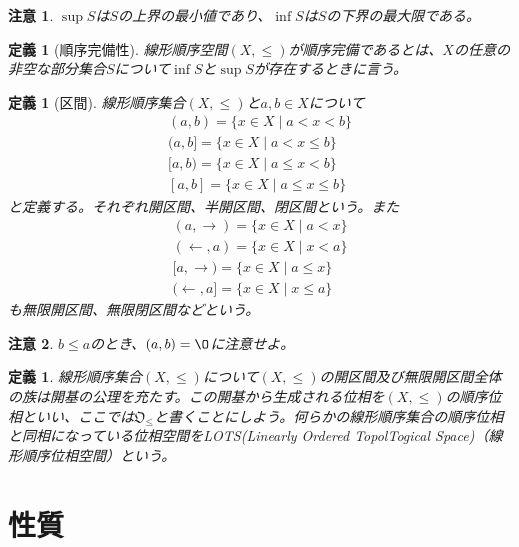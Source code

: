 \documentclass[leqno]{jsarticle}
\newtheorem{df}[thm]{定義}
\newtheorem*{cau}{注意}
\begin{document}
\begin{cau}
$\sup S$は$S$の上界の最小値であり、$\inf S$は$S$の下界の最大限である。
\end{cau}

\begin{df}[順序完備性]
線形順序空間$(X,\le)$が順序完備であるとは、$X$の任意の非空な部分集合$S$について$\inf S$と$\sup S$が存在するときに言う。
\end{df}

\begin{df}[区間]
線形順序集合$(X,\le)$と$a,b\in X$について
\begin{align}
(a,b)=\{x\in X\mid a<x<b\}\\
(a,b]=\{x\in X\mid a<x\le b\}\\
[a,b)=\{x\in X\mid a\le x<b\}\\
[a,b]=\{x\in X\mid a\le x\le b\}
\end{align}
と定義する。それぞれ開区間、半開区間、閉区間という。また
\begin{align}
(a,\to)=\{x\in X\mid a<x \}\\
(\gets,a)=\{x\in X\mid x<a\}\\
[a,\to)=\{x\in X\mid a\le x\}\\
(\gets,a]=\{x\in X\mid x\le a \}
\end{align}
も無限開区間、無限閉区間などという。
\end{df}

\begin{cau}
$b\le a$のとき、$(a,b)=\O$に注意せよ。
\end{cau}

\begin{df}
線形順序集合$(X,\le)$について$(X,\le )$の開区間及び無限開区間全体の族は開基の公理を充たす。この開基から生成される位相を$(X,\le)$の順序位相といい、ここでは$\mathfrak{O}_{\le}$と書くことにしよう。何らかの線形順序集合の順序位相と同相になっている位相空間をLOTS(Linearly Ordered TopolTogical Space)（線形順序位相空間）という。
\end{df}

\section{性質}
\end{document}
